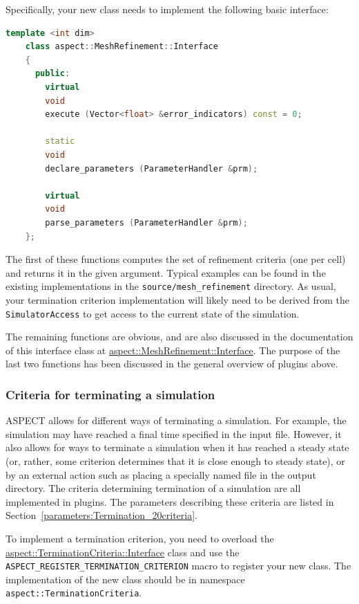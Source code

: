 \documentclass{article}
\newcommand{\aspect}{\textsc{ASPECT}}
\begin{document}
Specifically, your new class needs to implement the following basic interface:
\begin{lstlisting}[frame=single,language=C++]
    template <int dim>
    class aspect::MeshRefinement::Interface
    {
      public:
        virtual
        void
        execute (Vector<float> &error_indicators) const = 0;

        static
        void
        declare_parameters (ParameterHandler &prm);

        virtual
        void
        parse_parameters (ParameterHandler &prm);
    };
\end{lstlisting}
The first of these functions computes the set of refinement criteria (one per
cell) and returns it in the given argument. Typical examples can be found in the
existing implementations in the \texttt{source/mesh\_refinement} directory. As usual, your termination
criterion implementation will likely need to be derived from the
\texttt{SimulatorAccess} to get access to the current state of the simulation.

The
remaining functions are obvious, and are also discussed in the documentation of this interface class at \href{doc/doxygen/classaspect_1_1MeshRefinement_1_1Interface.html}{aspect::MeshRefinement::Interface}.
The purpose
of the last two functions has been discussed in the general overview of
plugins above.



\subsubsection{Criteria for terminating a simulation}
\label{sec:terminators}


\aspect{} allows for different ways of terminating a simulation. For example,
the simulation may have reached a final time specified in the input file.
However, it also allows for ways to terminate a simulation when it has reached a
steady state (or, rather, some criterion determines that it is close enough to
steady state), or by an external action such as placing a specially named file
in the output directory. The criteria
determining termination of a simulation are all implemented in plugins. The
parameters describing these criteria are listed in
Section~\ref{parameters:Termination_20criteria}.

To implement a termination criterion, you
need to overload the
\href{doc/doxygen/classaspect_1_1TerminationCriteria_1_1Interface.html}{aspect::TerminationCriteria::Interface}
class and use
the \texttt{ASPECT\_REGISTER\_TERMINATION\_CRITERION} macro to register
your new class. The implementation of the new class should be in namespace
\texttt{aspect::TerminationCriteria}.
\end{document}
